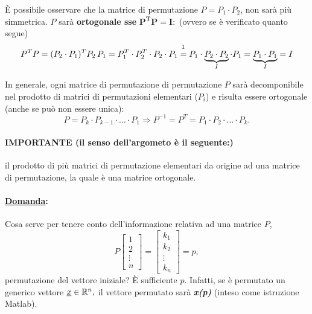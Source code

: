 È possibile osservare che la matrice di permutazione $P=P_1\cdot P_2$, non sarà più simmetrica. $P$ sarà \textbf{ortogonale sse} $\boldsymbol{P^T P=I}:$ (ovvero se è verificato quanto segue)
\begin{equation*}
    P^TP=(P_2\cdot P_1)^TP_2\, P_1=P_1^T\cdot P_2^T\cdot P_2\cdot P_1\overset{\footnotemark}{=}P_1\cdot \underbrace{P_2\cdot P_2}_{I}\cdot P_1=\underbrace{P_1\cdot P_1}_{I}=I
\end{equation*}

In generale, ogni matrice di permutazione di permutazione $P$ sarà decomponibile nel prodotto di matrici di permutazioni elementari ($P_i$) e risulta essere ortogonale (anche se può non essere unica):
\begin{equation*}
    P=P_k\cdot P_{k-1}\cdot\hdots\cdot P_1\Rightarrow P^{-1}=P^T=P_1\cdot P_2\cdot\hdots\cdot P_k.
\end{equation*}

\paragraph{IMPORTANTE (il senso dell'argometo è il seguente:)}{il prodotto di più matrici di permutazione elementari da origine ad una matrice di permutazione, la quale è una matrice ortogonale.}

\paragraph{\ul{Domanda}:}{Cosa serve per tenere conto dell'informazione relativa ad una matrice $P$,
\begin{equation*}
    P\begin{bmatrix}
        1\\
        2\\
        \vdots\\
        n
    \end{bmatrix} = 
    \begin{bmatrix}
        k_1\\
        k_2\\
        \vdots\\
        k_n
    \end{bmatrix} = p,
\end{equation*}
permutazione del vettore iniziale? È sufficiente $p$. Infatti, se è permutato un generico vettore $\uline x\in\mathbb R^n,$ il vettore permutato sarà \textbf{\textit{x(p)}} (inteso come istruzione Matlab).}

